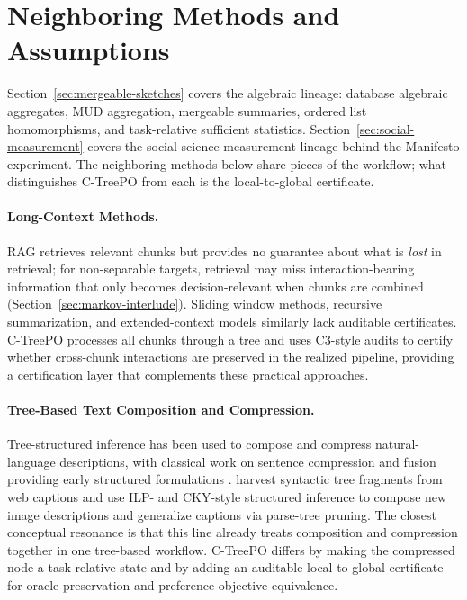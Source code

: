\section{Neighboring Methods and Assumptions}\label{sec:related}

Section~\ref{sec:mergeable-sketches} covers the algebraic lineage:
database algebraic aggregates, MUD aggregation, mergeable summaries,
ordered list homomorphisms, and task-relative sufficient statistics.
Section~\ref{sec:social-measurement} covers the social-science
measurement lineage behind the Manifesto experiment. The neighboring
methods below share pieces of the workflow; what distinguishes C-TreePO
from each is the local-to-global certificate.

\paragraph{Long-Context Methods.}
RAG retrieves relevant chunks but provides no guarantee about what is
\emph{lost} in retrieval; for non-separable targets, retrieval may miss
interaction-bearing information that only becomes decision-relevant when
chunks are combined (Section~\ref{sec:markov-interlude}). Sliding window
methods, recursive summarization, and extended-context models similarly
lack auditable certificates. C-TreePO processes all chunks through a tree
and uses C3-style audits to certify whether cross-chunk interactions are
preserved in the realized pipeline, providing a certification layer that
complements these practical approaches.

\paragraph{Tree-Based Text Composition and Compression.}
Tree-structured inference has been used to compose and compress
natural-language descriptions, with classical work on sentence
compression and fusion providing early structured formulations
\citep{KnightMarcu2000SentenceCompression,BarzilayMcKeown2005SentenceFusion,ClarkeLapata2008ILPSentenceCompression}.
\citet{KuznetsovaEtAl2014TreeTalk} harvest syntactic tree fragments from
web captions and use ILP- and CKY-style structured inference to compose
new image descriptions and generalize captions via parse-tree pruning.
The closest conceptual resonance is that this line already treats
composition and compression together in one tree-based workflow. C-TreePO
differs by making the compressed node a task-relative state and by adding
an auditable local-to-global certificate for oracle preservation and
preference-objective equivalence.

